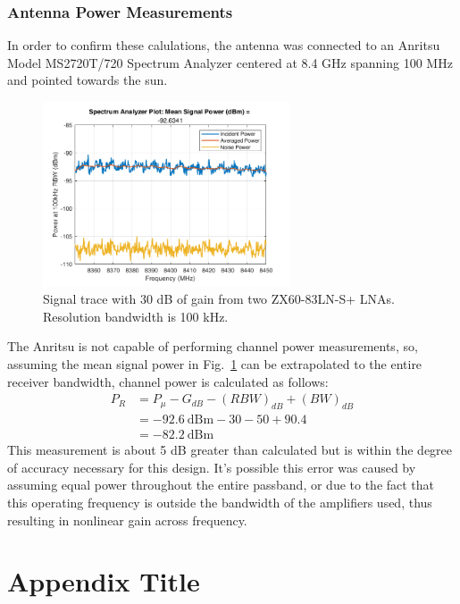 \documentclass[titlepage]{article}
\begin{document}
\subsubsection{Antenna Power Measurements}
In order to confirm these calulations, the antenna was connected to an Anritsu Model MS2720T/720 Spectrum Analyzer centered at 8.4 GHz spanning 100 MHz and pointed towards the sun.
\begin{figure}[H]%
\begin {center}
\includegraphics[width=0.65\textwidth]{images/specan1.png}
\caption{Signal trace with 30 dB of gain from two ZX60-83LN-S+ LNAs. Resolution bandwidth is 100 kHz.}
\label{fig:specan1}
\end {center}
\end{figure}
The Anritsu is not capable of performing channel power measurements, so, assuming the mean signal power in Fig.~\ref{fig:specan1} can be extrapolated to the entire receiver bandwidth, channel power is calculated as follows:
\begin{align*}
    P_R &= P_{\mu} - G_{dB} - \left(RBW\right)_{dB} + \left(BW\right)_{dB}\\
        &= -92.6\ \text{dBm} - 30 - 50 + 90.4\\
        &= -82.2\ \text{dBm}
\end{align*}
This measurement is about 5 dB greater than calculated but is within the degree of accuracy necessary for this design. It's possible this error was caused by assuming equal power throughout the entire passband, or due to the fact that this operating frequency is outside the bandwidth of the amplifiers used, thus resulting in nonlinear gain across frequency.


\appendix
\section{Appendix Title}



\end{document}
